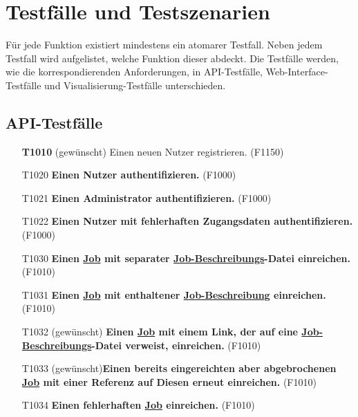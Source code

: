 \section{Testfälle und Testszenarien}
Für jede Funktion existiert mindestens ein atomarer Testfall. Neben jedem Testfall wird aufgelistet, welche Funktion dieser abdeckt. Die Testfälle werden, wie die korrespondierenden Anforderungen, in \gls{API}-Testfälle, \gls{Web-Interface}-Testfälle und Visualisierung-Testfälle unterschieden.

\subsection{API-Testfälle}


\begin{itemize}

    \item[\textbf{T1010}] (gewünscht) Einen neuen \gls{Nutzer} registrieren. (F1150)
    
    \item[T1020] \textbf{Einen \gls{Nutzer} authentifizieren.} (F1000)
    
    \item[T1021] \textbf{Einen \gls{Administrator} authentifizieren.} (F1000)
    
    \item[T1022] \textbf{Einen \gls{Nutzer} mit fehlerhaften Zugangsdaten authentifizieren.} (F1000)
    
    \item[T1030] \textbf{Einen \hyperref[B:Jobs]{Job} mit separater \hyperref[B:Job-Beschreibung]{Job-Beschreibungs}-Datei einreichen.} (F1010)
    
    \item[T1031] \textbf{Einen \hyperref[B:Jobs]{Job} mit enthaltener \hyperref[B:Job-Beschreibung]{Job-Beschreibung} einreichen.} (F1010)
    
    \item[T1032] (gewünscht) \textbf{Einen \hyperref[B:Jobs]{Job} mit einem Link, der auf eine \hyperref[B:Job-Beschreibung]{Job-Beschreibungs}-Datei verweist, einreichen.} (F1010)
    
    \item[T1033] (gewünscht)\textbf{Einen bereits eingereichten aber abgebrochenen \hyperref[B:Jobs]{Job} mit einer Referenz auf Diesen erneut einreichen.} (F1010)
    
    \item[T1034] \textbf{Einen fehlerhaften \hyperref[B:Jobs]{Job} einreichen.} (F1010)
    

\end{itemize}
